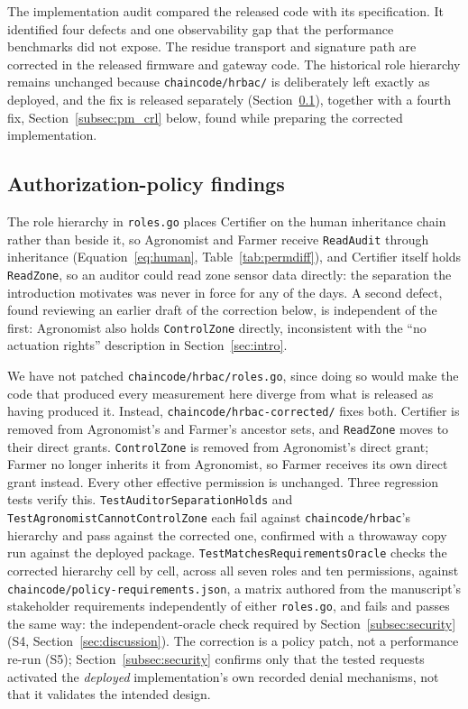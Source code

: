 \documentclass[a4paper,fleqn]{cas-sc}
\begin{document}
The implementation audit compared the released code with its specification.
It identified four defects and one observability gap that the performance
benchmarks did not expose. The residue transport and signature path are
corrected in the released firmware and gateway code. The historical role
hierarchy remains unchanged because \texttt{chaincode/hrbac/} is
deliberately left exactly as deployed, and the fix is released separately
(Section~\ref{subsec:pm_policy}), together with a fourth fix,
Section~\ref{subsec:pm_crl} below, found while preparing the corrected implementation.

\subsection{Authorization-policy findings}
\label{subsec:pm_policy}

The role hierarchy in \texttt{roles.go} places Certifier on the human
inheritance chain rather than beside it, so Agronomist and Farmer receive
\texttt{ReadAudit} through inheritance (Equation~\eqref{eq:human},
Table~\ref{tab:permdiff}), and Certifier itself holds \texttt{ReadZone}, so
an auditor could read zone sensor data directly: the separation the
introduction motivates was never in force for any of the \DeployDays{}
days. A second defect, found reviewing an earlier draft of the correction
below, is independent of the first: Agronomist also holds
\texttt{ControlZone} directly, inconsistent with the ``no actuation
rights'' description in Section~\ref{sec:intro}.

We have not patched \texttt{chaincode/hrbac/roles.go}, since doing so
would make the code that produced every measurement here diverge from
what is released as having produced it. Instead,
\texttt{chaincode/hrbac-corrected/} fixes both. Certifier is removed from
Agronomist's and Farmer's ancestor sets, and \texttt{ReadZone} moves to
their direct grants. \texttt{ControlZone} is removed from Agronomist's
direct grant; Farmer no longer inherits it from Agronomist, so Farmer
receives its own direct grant instead. Every other effective permission is
unchanged. Three regression tests verify this.
\texttt{TestAuditorSeparationHolds} and
\texttt{TestAgronomistCannotControlZone} each fail against
\texttt{chaincode/hrbac}'s hierarchy and pass against the corrected one,
confirmed with a throwaway copy run against the deployed package.
\texttt{TestMatchesRequirementsOracle} checks the corrected hierarchy cell
by cell, across all seven roles and ten permissions, against
\texttt{chaincode/policy-requirements.json}, a matrix authored from the
manuscript's stakeholder requirements independently of either
\texttt{roles.go}, and fails and passes the same way: the independent-oracle
check required by Section~\ref{subsec:security} (S4,
Section~\ref{sec:discussion}). The correction is a policy patch, not a
performance re-run (S5); Section~\ref{subsec:security} confirms only that
the tested requests activated the \emph{deployed} implementation's own
recorded denial mechanisms, not that it validates the intended design.
\end{document}
